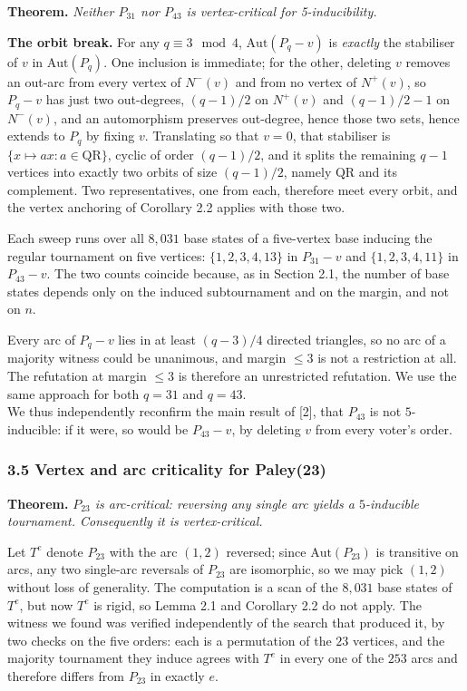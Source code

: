 \documentclass[
]{article}
\begin{document}
\textbf{Theorem.} \emph{Neither \(P_{31}\) nor \(P_{43}\) is
vertex-critical for 5-inducibility.}

\textbf{The orbit break.} For any \(q \equiv 3 \mod 4\),
\(\mathrm{Aut}(P_{q} - v)\) is \emph{exactly} the stabiliser of \(v\) in
\(\mathrm{Aut}(P_{q})\). One inclusion is immediate; for the other,
deleting \(v\) removes an out-arc from every vertex of \(N^{-}(v)\) and
from no vertex of \(N^{+}(v)\), so \(P_q - v\) has just two out-degrees,
\((q-1)/2\) on \(N^{+}(v)\) and \((q-1)/2 - 1\) on \(N^{-}(v)\), and an
automorphism preserves out-degree, hence those two sets, hence extends
to \(P_q\) by fixing \(v\). Translating so that \(v = 0\), that
stabiliser is \(\{x \mapsto ax : a \in \mathrm{QR}\}\), cyclic of order
\((q-1)/2\), and it splits the remaining \(q - 1\) vertices into exactly
two orbits of size \((q-1)/2\), namely \(\mathrm{QR}\) and its
complement. Two representatives, one from each, therefore meet every
orbit, and the vertex anchoring of Corollary 2.2 applies with those two.

Each sweep runs over all \(8{,}031\) base states of a five-vertex base
inducing the regular tournament on five vertices: \(\{1,2,3,4,13\}\) in
\(P_{31} - v\) and \(\{1,2,3,4,11\}\) in \(P_{43} - v\). The two counts
coincide because, as in Section 2.1, the number of base states depends
only on the induced subtournament and on the margin, and not on \(n\).

Every arc of \(P_{q} - v\) lies in at least \((q-3)/4\) directed
triangles, so no arc of a majority witness could be unanimous, and
margin \(\le 3\) is not a restriction at all. The refutation at margin
\(\le 3\) is therefore an unrestricted refutation. We use the same
approach for both \(q = 31\) and \(q = 43\).\\
We thus independently reconfirm the main result of {[}2{]}, that
\(P_{43}\) is not \(5\)-inducible: if it were, so would be
\(P_{43} - v\), by deleting \(v\) from every voter's order.

\subsubsection{3.5 Vertex and arc criticality for
Paley(23)}\label{vertex-and-arc-criticality-for-paley23}

\textbf{Theorem.} \emph{\(P_{23}\) is arc-critical: reversing any single
arc yields a \(5\)-inducible tournament. Consequently it is
vertex-critical.}

Let \(T^{e}\) denote \(P_{23}\) with the arc \((1,2)\) reversed; since
\(\mathrm{Aut}(P_{23})\) is transitive on arcs, any two single-arc
reversals of \(P_{23}\) are isomorphic, so we may pick \((1,2)\) without
loss of generality. The computation is a scan of the \(8{,}031\) base
states of \(T^{e}\), but now \(T^{e}\) is rigid, so Lemma 2.1 and
Corollary 2.2 do not apply. The witness we found was verified
independently of the search that produced it, by two checks on the five
orders: each is a permutation of the \(23\) vertices, and the majority
tournament they induce agrees with \(T^{e}\) in every one of the \(253\)
arcs and therefore differs from \(P_{23}\) in exactly \(e\).
\end{document}
